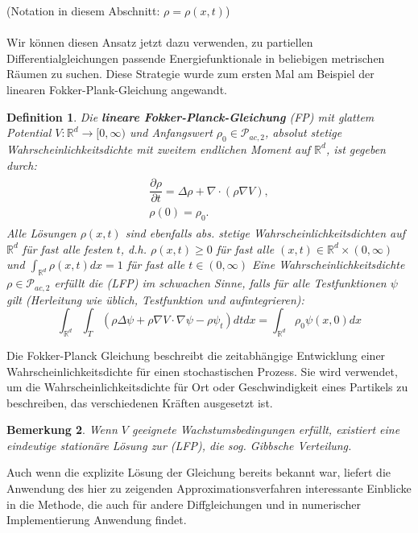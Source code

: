 \documentclass[11pt,a4paper,notitlepage]{scrreprt}
\newcommand{\RR}{\mathbb{R}}
\newtheorem{defi}{Definition}[section]
\newtheorem{bem}[defi]{Bemerkung}
\begin{document}
(Notation in diesem Abschnitt: $\rho=\rho(x,t)$)\\\\
Wir können diesen Ansatz jetzt dazu verwenden, zu partiellen Differentialgleichungen passende Energiefunktionale in beliebigen metrischen Räumen zu suchen. Diese Strategie wurde zum ersten Mal am Beispiel der linearen Fokker-Plank-Gleichung angewandt. \\
\begin{defi}
Die \textbf{lineare Fokker-Planck-Gleichung} (FP) mit glattem Potential $V:\RR^d\to[0,\infty)$ und Anfangswert $\rho_0\in\mathcal{P}_{ac,2}$, absolut stetige Wahrscheinlichkeitsdichte mit zweitem endlichen Moment auf $\RR^d$, ist gegeben durch:
\begin{eqnarray}
\begin{split}
\dfrac{\partial\rho}{\partial t}=\Delta\rho+\nabla\cdot(\rho\nabla V),\\
\rho(0)=\rho_0.\label{FP}
\end{split}
\end{eqnarray}
Alle Lösungen $\rho(x,t)$ sind ebenfalls abs. stetige Wahrscheinlichkeitsdichten auf $\RR^d$ für fast alle festen $t$, d.h. $\rho(x,t)\geq 0$ für fast alle $(x,t)\in \RR^d\times(0,\infty)$  und $\int_{\RR^d}\rho(x,t)dx=1$ für fast alle $t\in(0,\infty)$
Eine Wahrscheinlichkeitsdichte $\rho\in\mathcal{P}_{ac,2}$ erfüllt die (LFP) im schwachen Sinne, falls für alle Testfunktionen $\psi$ gilt (Herleitung wie üblich, Testfunktion und aufintegrieren):
\begin{equation}
\int_{\RR^d} \int_T (\rho\Delta\psi+\rho\nabla V\cdot\nabla\psi -\rho\psi_t) dt dx=\int_{\RR^d}\rho_0\psi(x,0)dx \label{FPweak}
\end{equation}
\end{defi}

Die Fokker-Planck Gleichung beschreibt die zeitabhängige Entwicklung einer Wahrscheinlichkeitsdichte für einen stochastischen Prozess. Sie wird verwendet, um die Wahrscheinlichkeitsdichte für Ort oder Geschwindigkeit eines Partikels zu beschreiben, das verschiedenen Kräften ausgesetzt ist.

\begin{bem}
Wenn $V$ geeignete Wachstumsbedingungen erfüllt, existiert eine eindeutige stationäre Lösung zur (LFP), die sog. Gibbsche Verteilung.
\end{bem}
Auch wenn die explizite Lösung der Gleichung bereits bekannt war, liefert die Anwendung des hier zu zeigenden Approximationsverfahren interessante Einblicke in die Methode, die auch für andere Diffgleichungen und in numerischer Implementierung Anwendung findet. 
\end{document}
